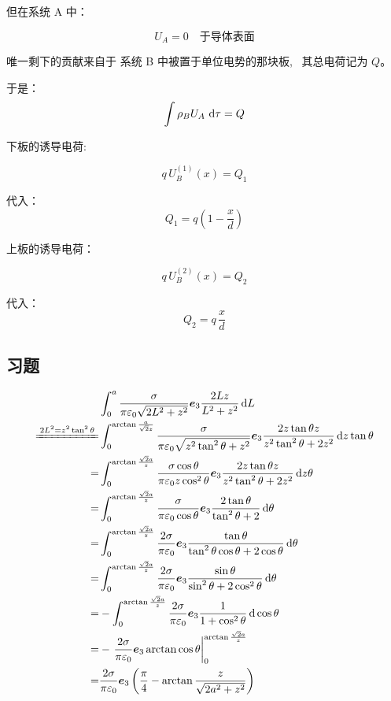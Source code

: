 但在系统 A 中：

\[
U_A=0 \quad \text{于导体表面}
\]

唯一剩下的贡献来自于
系统 B 中被置于单位电势的那块板, \,
其总电荷记为 \(Q\)。

于是：
\[
\int \rho_B U_A\,\dif \tau
=
Q
\]

下板的诱导电荷:

\[
q\,U_B^{(1)}(x)=Q_1
\]

代入：
\[
{
Q_1
=
q\left(1-\frac{x}{d}\right)
}
\]


上板的诱导电荷：

\[
q\,U_B^{(2)}(x)=Q_2
\]

代入：
\[
{
Q_2
=
q\,\frac{x}{d}
}
\]

\subsection{习题}
\begin{align*}
    &\int_{0}^{a}\frac{\sigma}{\pi\varepsilon_0\sqrt{2L^2+z^2}}\boldsymbol e_3\frac{2Lz}{{L^2+z^2}}\dif L\\
    \xlongequal{2L^2=z^2\tan^2\theta}&\int_{0}^{\arctan\frac{a}{\sqrt{2}z}}\frac{\sigma}{\pi\varepsilon_0\sqrt{z^2\tan^2\theta+z^2}}\boldsymbol e_3\frac{2z\tan\theta z}{{z^2\tan^2\theta+2z^2}}\dif z\tan\theta\\
    =&\int_{0}^{\arctan\frac{\sqrt{2}a}{z}}\frac{\sigma\cos\theta}{\pi\varepsilon_0z\cos^2\theta}\boldsymbol e_3\frac{2z\tan\theta z}{{z^2\tan^2\theta+2z^2}}\dif z\theta\\
    =&\int_{0}^{\arctan\frac{\sqrt{2}a}{z}}\frac{\sigma}{\pi\varepsilon_0\cos\theta}\boldsymbol e_3\frac{2\tan\theta}{{\tan^2\theta+2}}\dif \theta\\
    =&\int_{0}^{\arctan\frac{\sqrt{2}a}{z}}\frac{2\sigma}{\pi\varepsilon_0 }\boldsymbol e_3\frac{\tan\theta}{{\tan^2\theta\cos\theta+2\cos\theta}}\dif \theta\\
    =&\int_{0}^{\arctan\frac{\sqrt{2}a}{z}}\frac{2\sigma}{\pi\varepsilon_0 }\boldsymbol e_3\frac{\sin\theta}{{\sin^2\theta+2\cos^2\theta}}\dif \theta\\
    =&-\int_{0}^{\arctan\frac{\sqrt{2}a}{z}}\frac{2\sigma}{\pi\varepsilon_0 }\boldsymbol e_3\frac{1}{{1+\cos^2\theta}}\dif \cos\theta\\
    =&-\left.\frac{2\sigma}{\pi\varepsilon_0 }\boldsymbol e_3\arctan\cos\theta\right|_{0}^{\arctan\frac{\sqrt{2}a}{z}}\\
    =&\frac{2\sigma}{\pi\varepsilon_0 }\boldsymbol e_3\left(\frac{\pi}{4}-\arctan\frac{z}{\sqrt{2a^2+z^2}}\right)
\end{align*}
